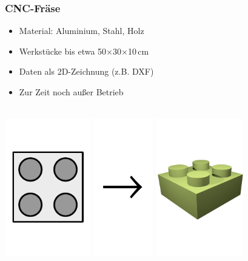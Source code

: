 \documentclass[t]{beamer}
\begin{document}
\begin{frame}
	\frametitle{CNC-Fräse}
	\begin{itemize}
		\item Material: Aluminium, Stahl, Holz
		\item Werkstücke bis etwa 50$\times$30$\times$10\,cm
		\item Daten als 2D-Zeichnung (z.B. DXF) %
		\item Zur Zeit noch außer Betrieb
	\end{itemize}
	\begin{center}
	~\\
	\includegraphics[height=6cm]{../img/legozeichnung.pdf}
	\includegraphics[height=6cm]{../img/pfeil.pdf}
	\includegraphics[height=6cm]{../img/fraese-lego-3d.png}

\end{center}
\end{frame}
\end{document}
